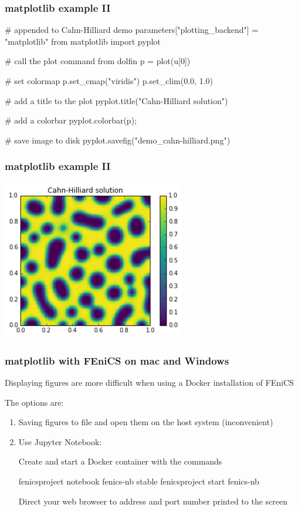 \begin{frame}[fragile]
\frametitle{matplotlib example II}
  \begin{python}
# appended to Cahn-Hilliard demo
parameters["plotting_backend"] = "matplotlib"
from matplotlib import pyplot

# call the plot command from dolfin
p = plot(u[0])

# set colormap
p.set_cmap("viridis")
p.set_clim(0.0, 1.0)

# add a title to the plot
pyplot.title("Cahn-Hilliard solution")

# add a colorbar
pyplot.colorbar(p);

# save image to disk
pyplot.savefig("demo_cahn-hilliard.png")
  \end{python}
\end{frame}
\begin{frame}[fragile]
\frametitle{matplotlib example II}
  \begin{center}
    \includegraphics[width=8cm]{png/demo_cahn-hilliard.png}
  \end{center}

\end{frame}

\begin{frame}[fragile]
  \frametitle{matplotlib with FEniCS on mac and Windows}

  Displaying figures are more difficult when using a Docker installation of FEniCS

  The options are:
  \begin{enumerate}
    \item Saving figures to file and open them on the host system (inconvenient)
    \item Use Jupyter Notebook:

  Create and start a Docker container with the commands
    \begin{bash}
fenicsproject notebook fenics-nb stable
fenicsproject start fenics-nb
    \end{bash}
  Direct your web browser to address and port number printed to the screen

  \end{enumerate}
\end{frame}

